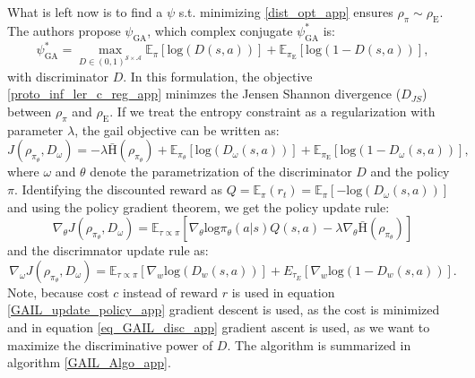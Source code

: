 What is left now is to find a $\psi$ s.t. minimizing \ref{dist_opt_app} ensures $\rho_{\pi} \sim \rho_{\text{E}}$. The authors propose $\psi_{\text{GA}}$, 
which complex conjugate $\psi^*_{\text{GA}}$ is: 
\begin{equation}
    \psi^*_{\text{GA}} = \max_{D\in(0,1)^{\mathcal{S} \times \mathcal{A}}} \mathbb{E}_{\pi}\left[ \text{log}(D(s,a))\right] + \mathbb{E}_{\pi_{\text{E}}}\left[ \text{log}(1 - D(s,a))\right],
\end{equation}
with discriminator $D$. In this formulation, the objective \ref{proto_inf_ler_c_reg_app} minimzes the Jensen Shannon divergence ($D_{JS}$) between $\rho_\pi$ and $\rho_{\text{E}}$. If we treat the entropy constraint as a regularization with 
parameter $\lambda$, the \ac{gail} objective can be written as:
\begin{equation}
    J(\rho_{\pi_{\theta}}, D_{\omega}) = - \lambda  \bar{\text{H}}(\rho_{\pi_{\theta}} ) + \mathbb{E}_{\pi_{\theta}}\left[ \text{log}(D_{\omega}(s,a))\right] + \mathbb{E}_{\pi_{\text{E}}}\left[ \text{log}(1 - D_{\omega}(s,a))\right],
\end{equation}
where $\omega$ and $\theta$ denote the parametrization of the discriminator $D$ and the policy $\pi$. Identifying the discounted reward as $Q = \mathbb{E}_{\pi}(r_t) = \mathbb{E}_{\pi}\left[-\text{log}(D_{\omega}(s,a))\right]$ and using the policy 
gradient theorem, we get the policy update rule:
\begin{equation}
    \label{GAIL_update_policy_app}
    \nabla_{\theta} J(\rho_{\pi_{\theta}}, D_{\omega}) = \mathbb{E}_{\tau \propto \pi}\left[ \nabla_{\theta}\text{log}\pi_{\theta}(a|s) Q(s,a) -\lambda \nabla_{\theta}\bar{\text{H}}(\rho_{\pi_{\theta}} )  \right]
\end{equation}
and the discrimnator update rule as:
\begin{equation}
    \label{eq_GAIL_disc_app}
    \nabla_{\omega} J(\rho_{\pi_{\theta}}, D_{\omega}) = \mathbb{E}_{\tau \propto \pi} [\nabla_w \mathrm{log}(D_w(s,a))] + {E}_{\tau_E} [\nabla_w \mathrm{log}(1 - D_w(s,a))].
\end{equation}
Note, because cost $c$ instead of reward $r$ is used in equation \ref{GAIL_update_policy_app} gradient descent is used, as the cost is minimized and in equation \ref{eq_GAIL_disc_app} 
gradient ascent is used, as we want to maximize the discriminative power of $D$. The algorithm is summarized in algorithm \ref{GAIL_Algo_app}.\\
